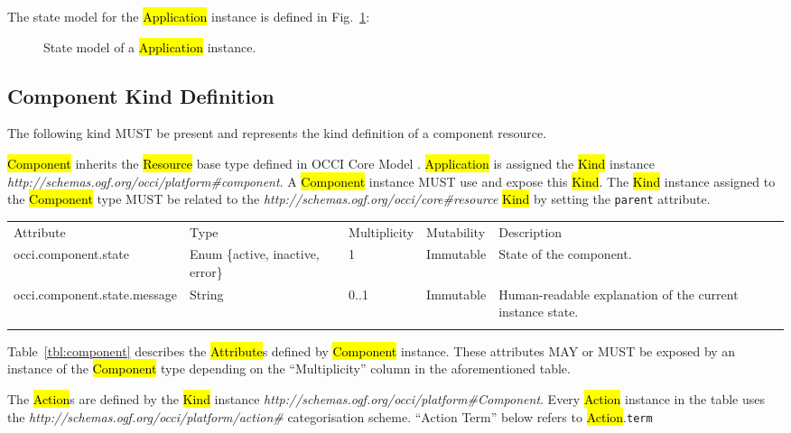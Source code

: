 \documentclass[10pt,a4paper]{article}
\begin{document}
The state model for the \hl{Application} instance is defined in Fig.~\ref{fig:app_state}:

\begin{figure}[!h]
	{\centering {} \par}
	\caption{State model of a \hl{Application} instance.}
	\label{fig:app_state}
\end{figure}

\subsection{Component Kind Definition}
The following kind MUST be present and represents the kind definition of a component resource.

\hl{Component} inherits the \hl{Resource} base type defined in OCCI Core Model \cite{occi:core}. \hl{Application} is assigned the \hl{Kind} instance \textit{http://schemas.ogf.org/occi/platform\#component}. A \hl{Component} instance MUST use and expose this \hl{Kind}. The \hl{Kind} instance assigned to the \hl{Component} type MUST be related to the \textit{http://schemas.ogf.org/occi/core\#resource} \hl{Kind} by setting the \texttt{parent} attribute.

{
	\begin{tabular}{lp{2.5cm}p{1cm}lp{5cm}}
	\toprule
	Attribute&Type&Multi\-plicity&Mutability&Description\\
	\colrule
	occi.component.state & Enum \{active, inactive, error\} & 1 & Immutable & State of the component.\\
	occi.component.state.message & String & 0..1 & Immutable & Human-readable explanation of the current instance state.\\
	\botrule
	\end{tabular}
}

Table~\ref{tbl:component} describes the \hl{Attribute}s defined by \hl{Component} instance. These attributes MAY or MUST be exposed by an instance of the \hl{Component} type depending on the ``Multiplicity'' column in the aforementioned table.

The \hl{Action}s are defined by the \hl{Kind} instance \textit{http://schemas.ogf.org/occi/platform\#Component}. Every \hl{Action} instance in the table uses the \textit{http://schemas.ogf.org/occi/platform/action\#} categorisation scheme. ``Action Term'' below refers to \hl{Action}.{\tt term}
\end{document}
